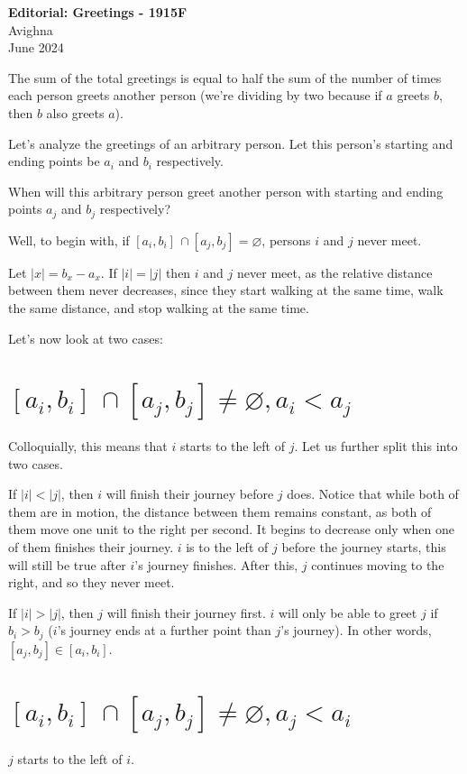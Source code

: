 \documentclass{article}
\begin{document}
\begin{center}
  \large{\textbf{Editorial: Greetings - 1915F}}\\
  \vspace{0.2em}
  \large{Avighna}\\
  \vspace{0.2em}
  \large{June 2024}
\end{center}

The sum of the total greetings is equal to half the sum of the number of times each person greets another person (we're dividing by two because if $a$ greets $b$, then $b$ also greets $a$).

Let's analyze the greetings of an arbitrary person. Let this person's starting and ending points be $a_i$ and $b_i$ respectively.

When will this arbitrary person greet another person with starting and ending points $a_j$ and $b_j$ respectively?

Well, to begin with, if $[a_i, b_i] \, \cap [a_j, b_j] = \varnothing$, persons $i$ and $j$ never meet.

Let $|x| = b_x - a_x$. If $|i|=|j|$ then $i$ and $j$ never meet, as the relative distance between them never decreases, since they start walking at the same time, walk the same distance, and stop walking at the same time.

Let's now look at two cases:
\section{$[a_i, b_i] \, \cap [a_j, b_j] \neq \varnothing, a_i < a_j$}
Colloquially, this means that $i$ starts to the left of $j$. Let us further split this into two cases.

If $|i| < |j|$, then $i$ will finish their journey before $j$ does. Notice that while both of them are in motion, the distance between them remains constant, as both of them move one unit to the right per second. It begins to decrease only when one of them finishes their journey. $i$ is to the left of $j$ before the journey starts, this will still be true after $i$'s journey finishes. After this, $j$ continues moving to the right, and so they never meet.

If $|i|>|j|$, then $j$ will finish their journey first. $i$ will only be able to greet $j$ if $b_i > b_j$ ($i$'s journey ends at a further point than $j$'s journey). In other words, $[a_j,b_j] \in [a_i,b_i]$.

\section{$[a_i, b_i] \, \cap [a_j, b_j] \neq \varnothing, a_j < a_i$}
$j$ starts to the left of $i$.
\end{document}
